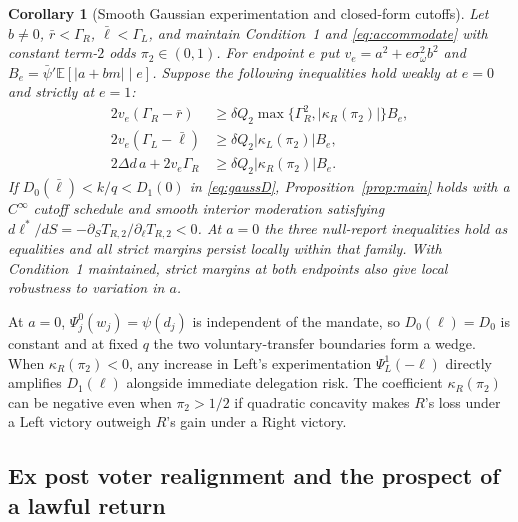 \documentclass[11pt,letterpaper]{article}
\newtheorem{corollary}{Corollary}
\newcommand{\E}{\mathbb E}
\newcommand{\Dd}{\Delta d}
\begin{document}
\begin{corollary}[Smooth Gaussian experimentation and closed-form cutoffs]\label{cor:family}
Let $b\ne0$, $\bar r<\Gamma_R$, $\bar\ell<\Gamma_L$, and maintain Condition~1 and \eqref{eq:accommodate} with constant term-$2$ odds $\pi_2\in(0,1)$. For endpoint $e$ put $v_e=a^2+e\sigma_\omega^2 b^2$ and $B_e=\bar\psi'\E[|a+bm|\mid e]$. Suppose the following inequalities hold weakly at $e=0$ and strictly at $e=1$:
\begin{align*}
 2v_e(\Gamma_R-\bar r)&\ge\delta Q_2\max\{\Gamma_R^2,|\kappa_R(\pi_2)|\}B_e,\\
 2v_e(\Gamma_L-\bar\ell)&\ge\delta Q_2|\kappa_L(\pi_2)|B_e,\\
 2\Dd\,a+2v_e\Gamma_R&\ge\delta Q_2|\kappa_R(\pi_2)|B_e.
\end{align*}
If $D_0(\bar\ell)<k/q<D_1(0)$ in \eqref{eq:gaussD}, Proposition~\ref{prop:main} holds with a $C^\infty$ cutoff schedule and smooth interior moderation satisfying $d\ell^*/dS=-\partial_S T_{R,2}/\partial_\ell T_{R,2}<0$. At $a=0$ the three null-report inequalities hold as equalities and all strict margins persist locally within that family. With Condition~1 maintained, strict margins at both endpoints also give local robustness to variation in $a$.
\end{corollary}

At $a=0$, $\Psi_j^0(w_j)=\psi(d_j)$ is independent of the mandate, so $D_0(\ell)=D_0$ is constant and at fixed $q$ the two voluntary-transfer boundaries form a wedge. When $\kappa_R(\pi_2)<0$, any increase in Left's experimentation $\Psi_L^1(-\ell)$ directly amplifies $D_1(\ell)$ alongside immediate delegation risk. The coefficient $\kappa_R(\pi_2)$ can be negative even when $\pi_2>1/2$ if quadratic concavity makes $R$'s loss under a Left victory outweigh $R$'s gain under a Right victory.

\subsection{Ex post voter realignment and the prospect of a lawful return}\label{sec:counter}
\end{document}
